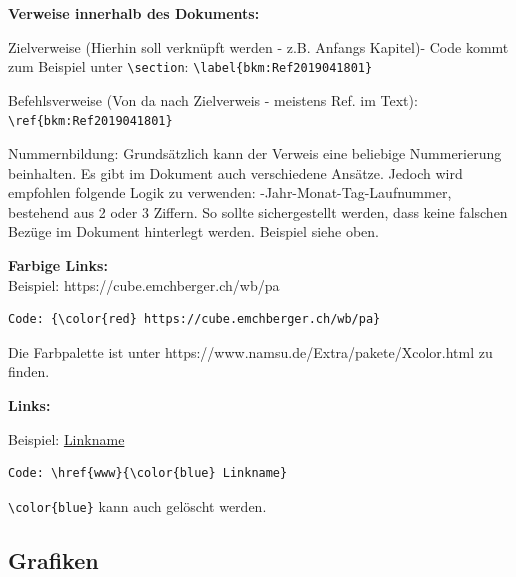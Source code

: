 \textbf{Verweise innerhalb des Dokuments:}

\begin{compactitem}
	\item Zielverweise (Hierhin soll verknüpft werden - z.B. Anfangs Kapitel)- Code kommt zum Beispiel unter \verb+\section+: \verb+\label{bkm:Ref2019041801}+
	\item Befehlsverweise (Von da nach Zielverweis - meistens Ref. im Text): \verb+\ref{bkm:Ref2019041801}+
\end{compactitem}

\vspace{\baselineskip}

Nummernbildung: Grundsätzlich kann der Verweis eine beliebige Nummerierung beinhalten. Es gibt im Dokument auch verschiedene Ansätze. Jedoch wird empfohlen folgende Logik zu verwenden: -Jahr-Monat-Tag-Laufnummer, bestehend aus 2 oder 3 Ziffern. So sollte sichergestellt werden, dass keine falschen Bezüge im Dokument hinterlegt werden. Beispiel siehe oben.

\vspace{\baselineskip}

\textbf{Farbige Links:}\\
Beispiel: {\color{red} https://cube.emchberger.ch/wb/pa}
\begin{verbatim}
Code: {\color{red} https://cube.emchberger.ch/wb/pa}
\end{verbatim}
Die Farbpalette ist unter {\color{blue} https://www.namsu.de/Extra/pakete/Xcolor.html} zu finden.

\vspace{\baselineskip}

\textbf{Links:}

Beispiel: \href{www}{\color{blue} Linkname}

\begin{verbatim}
Code: \href{www}{\color{blue} Linkname}
\end{verbatim}

\verb+\color{blue}+ kann auch gelöscht werden.




\pagebreak
\subsection{Grafiken}

